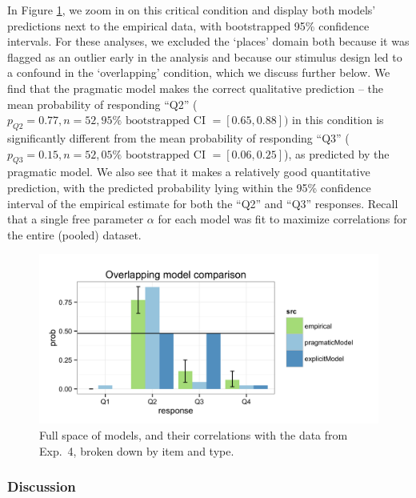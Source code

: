 \documentclass[12pt, floatsintext, man]{apa6}
\begin{document}
In Figure \ref{fig:Exp4ZoomedIn}, we zoom in on this critical condition and display both models' predictions next to the empirical data, with bootstrapped 95\% confidence intervals. For these analyses, we excluded the `places' domain both because it was flagged as an outlier early in the analysis and because our stimulus design led to a confound in the `overlapping' condition, which we discuss further below. We find that the pragmatic model makes the correct qualitative prediction -- the mean probability of responding ``Q2'' ($p_{Q2} = 0.77, n = 52, 95\%\textrm{ bootstrapped CI }= [0.65, 0.88])$ in this condition is significantly different from the mean probability of responding ``Q3'' ($p_{Q3} = 0.15, n = 52, 05\% \textrm{ bootstrapped CI }=[0.06, 0.25]$), as predicted by the pragmatic model. We also see that it makes a relatively good quantitative prediction, with the predicted probability lying within the 95\% confidence interval of the empirical estimate for both the ``Q2'' and ``Q3'' responses. Recall that a single free parameter $\alpha$ for each model was fit to maximize correlations for the entire (pooled) dataset.

%
\begin{figure}[t!]
\begin{center}
\includegraphics[scale=.25]{OverlappingModelComparison.png}
\end{center}
\vspace{-.5cm}
\caption{Full space of models, and their correlations with the data from Exp.~4, broken down by item and type.}
\label{fig:Exp4ZoomedIn}
\vspace{-.15cm}
\end{figure}
%


\subsubsection{Discussion}
\end{document}
